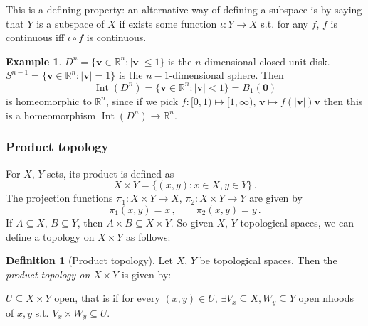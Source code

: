 \documentclass[a4paper,11pt]{article}
\theoremstyle{definition}
\newtheorem*{defn}{Definition}
\newtheorem*{ex}{Example}
\DeclareMathOperator{\Int}{Int}
\numberwithin{equation}{section}
\begin{document}
This is a defining property: an alternative way of defining a subspace is by saying that $Y$ is a subspace of $X$ if exists some function $\iota:Y\rightarrow X$ s.t. for any $f$, $f$ is continuous iff $\iota\circ f$ is continuous.

\begin{ex}
$D^n=\{\mathbf{v}\in\mathbb{R}^n:|\mathbf{v}|\leq1\}$ is the $n$-dimensional closed unit disk. $S^{n-1}=\{\mathbf{v}\in\mathbb{R}^n:|\mathbf{v}|=1\}$ is the $n-1$-dimensional sphere. Then
\begin{equation}
    \Int(D^n)=\{\mathbf{v}\in\mathbb{R}^n:|\mathbf{v}|<1\}=B_1(\mathbf{0})
\end{equation}
is homeomorphic to $\mathbb{R}^n$, since if we pick $f:[0,1)\mapsto[1,\infty)$, $\mathbf{v}\mapsto f(|\mathbf{v}|)\mathbf{v}$ then this is a homeomorphism $\Int(D^n)\rightarrow \mathbb{R}^n$.
\end{ex}

\subsubsection{Product topology}
For $X$, $Y$ sets, its product is defined as
\begin{equation}
    X\times Y=\{(x,y):x\in X, y\in Y\}\,.
\end{equation}
The projection functions $\pi_1:X\times Y\rightarrow X$, $\pi_2:X\times Y\rightarrow Y$ are given by
\begin{equation}
    \pi_1(x,y)=x\,,\qquad\pi_2(x,y)=y\,.
\end{equation}
If $A\subseteq X$, $B\subseteq Y$, then $A\times B\subseteq X\times Y$. So given $X$, $Y$ topological spaces, we can define a topology on $X\times Y$ as follows:
\begin{defn}[Product topology]
    Let $X$, $Y$ be topological spaces. Then the \emph{product topology on} $X\times Y$ is given by:
    
    $U\subseteq X\times Y$ open, that is if for every $(x,y)\in U$, $\exists V_x\subseteq X, W_y\subseteq Y$ open nhoods of $x, y$ s.t. $V_x\times W_y\subseteq U$.
\end{defn}
\end{document}
